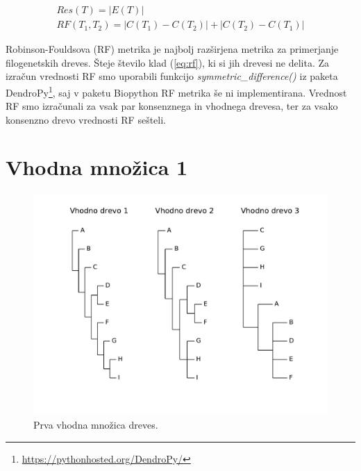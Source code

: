 \documentclass[a4paper, 12pt]{book}
\begin{document}
\begin{align}
	Res(T) = \left|E(T)\right| \label{eq:res} ~~~~~~~~~~~~~~~~~~~~~ \\
	RF(T_1, T_2) = \left|C(T_1) - C(T_2)\right| + \left|C(T_2) - C(T_1)\right|  \label{eq:rf}
\end{align}

Robinson-Fouldsova (RF) metrika je najbolj razširjena metrika za primerjanje filogenetskih dreves. Šteje število klad (\ref{eq:rf}), ki si jih drevesi ne delita\cite{rf}. Za izračun vrednosti RF smo uporabili funkcijo {\it symmetric\_difference()} iz paketa DendroPy\footnote{\url{https://pythonhosted.org/DendroPy/}}, saj v paketu Biopython RF metrika še ni implementirana. Vrednost RF smo izračunali za vsak par konsenznega in vhodnega drevesa, ter za vsako konsenzno drevo vrednosti RF sešteli.

\section{Vhodna množica 1}
\begin{figure}[h!]
	\begin{center}
		\includegraphics[scale=0.45, clip=true, trim=1cm 2cm 1cm 0]{gfx/eval_input.pdf}
	\end{center}
	\caption{Prva vhodna množica dreves.}
	\label{img-eval-input}
\end{figure}
\end{document}
